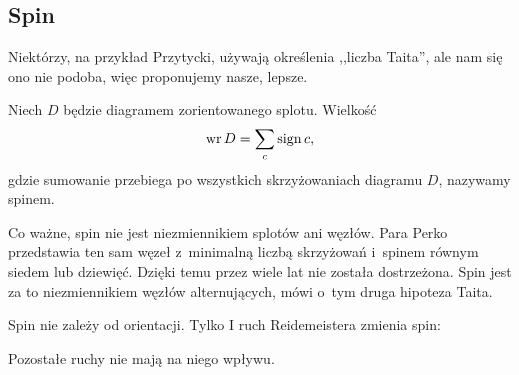 
\subsection{Spin}
%

Niektórzy, na przykład Przytycki, używają określenia ,,liczba Taita'', ale nam się ono nie podoba, więc proponujemy nasze, lepsze.

\begin{definition}[spin]
    Niech $D$ będzie diagramem zorientowanego splotu.
    Wielkość
    \begin{equation}
        \operatorname{wr} D = \sum_c \operatorname{sign} c,
    \end{equation}
    gdzie sumowanie przebiega po wszystkich skrzyżowaniach diagramu $D$, nazywamy spinem.
\end{definition}

Co ważne, spin nie jest niezmiennikiem splotów ani węzłów.
Para Perko przedstawia ten sam węzeł z~minimalną liczbą skrzyżowań i~spinem równym siedem lub dziewięć.
%
Dzięki temu przez wiele lat nie została dostrzeżona.
Spin jest za to niezmiennikiem węzłów alternujących, mówi o~tym druga hipoteza Taita.
%

\begin{lemma}
\label{lem:writhe_reidemeister}%
    Spin nie zależy od orientacji.
    Tylko I ruch Reidemeistera zmienia spin:
\begin{comment}
    \begin{equation}
        \writhe \left(\MediumReidemeisterOneLeft\right) =
        \writhe \left(\MediumReidemeisterOneStraight\right) - 1.
    \end{equation}
\end{comment}
    Pozostałe ruchy nie mają na niego wpływu.
\end{lemma}

%


